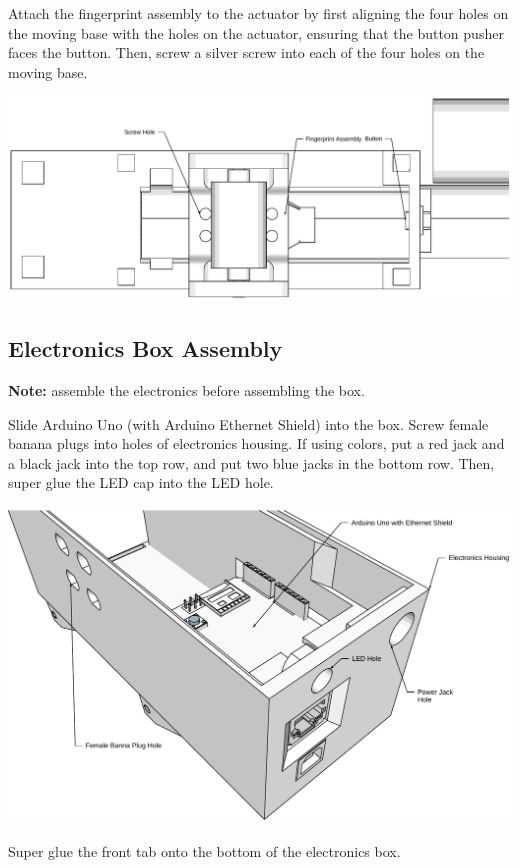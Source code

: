 \documentclass[letterpaper,10pt,english]{sphinxmanual}
\begin{document}
Attach the fingerprint assembly to the actuator by first aligning the four holes on the moving base with the holes on the actuator, ensuring that the button pusher faces the button. Then, screw a silver screw into each of the four holes on the moving base.

\includegraphics{FingerprintAssemblyInstallation.pdf}


\subsection{Electronics Box Assembly}
\label{NARFSTR:electronics-box-assembly}
\textbf{Note:} assemble the electronics before assembling the box.

Slide Arduino Uno (with Arduino Ethernet Shield) into the box. Screw female banana plugs into holes of electronics housing. If using colors, put a red jack and a black jack into the top row, and put two blue jacks in the bottom row. Then, super glue the LED cap into the LED hole.

\includegraphics{ArduinoInstallation.pdf}

Super glue the front tab onto the bottom of the electronics box.
\end{document}
